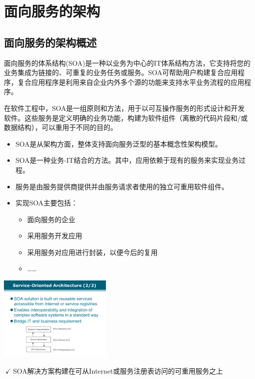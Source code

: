 \section{面向服务的架构}

\subsection{面向服务的架构概述}
面向服务的体系结构(SOA)是一种以业务为中心的IT体系结构方法，它支持将您的业务集成为链接的、可重复的业务任务或服务。SOA可帮助用户构建复合应用程序，复合应用程序是利用来自企业内外多个源的功能来支持水平业务流程的应用程序。

在软件工程中，SOA是一组原则和方法，用于以可互操作服务的形式设计和开发软件。这些服务是定义明确的业务功能，构建为软件组件（离散的代码片段和/或数据结构），可以重用于不同的目的。

\begin{itemize}
    \item SOA是从架构方面，整体支持面向服务泛型的基本概念性架构模型。
    \item SOA是一种业务-IT结合的方法。其中，应用依赖于现有的服务来实现业务过程。
    \item 服务是由服务提供商提供并由服务请求者使用的独立可重用软件组件。
    \item 实现SOA主要包括：
    \vspace{-0.8em}
    \begin{multicols}{2}
        \begin{itemize}
            \item 面向服务的企业
            \item 采用服务开发应用
            \item 采用服务对应用进行封装，以便今后的复用
            \item ……
    \end{itemize}
    \end{multicols}
    \vspace{-1em}
\end{itemize}

\begin{table}
    \centering
    \vspace{-2.5em}
    \includegraphics[width=5.5cm]{images/SOA结构.pdf}
    \vspace{-1.5em}
\end{table}
$\ \checkmark\;$SOA解决方案构建在可从Internet或服务注册表访问的可重用服务之上

